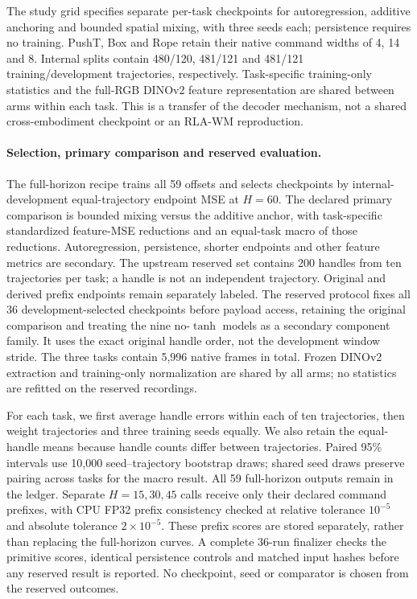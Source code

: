 The study grid specifies separate per-task checkpoints for autoregression,
additive anchoring and bounded spatial mixing, with three seeds each;
persistence requires no training. PushT, Box and Rope retain their native
command widths of 4, 14 and 8. Internal splits contain 480/120, 481/121 and
481/121 training/development trajectories, respectively. Task-specific
training-only statistics and the full-RGB DINOv2 feature representation are
shared between arms within each task. This is a transfer of the decoder
mechanism, not a shared cross-embodiment checkpoint or an RLA-WM reproduction.

\paragraph{Selection, primary comparison and reserved evaluation.}
The full-horizon recipe trains all 59 offsets and selects checkpoints
by internal-development equal-trajectory endpoint MSE at $H=60$.
The declared primary comparison is bounded mixing versus the additive anchor,
with task-specific standardized feature-MSE reductions and an equal-task
macro of those reductions. Autoregression, persistence, shorter endpoints
and other feature metrics are secondary. The upstream reserved set contains
200 handles from ten trajectories per task; a handle is not an independent
trajectory. Original and derived prefix endpoints remain separately labeled.
The reserved protocol fixes all 36 development-selected checkpoints before
payload access, retaining the original comparison and treating the nine
no-$\tanh$ models as a secondary component family. It uses the exact original
handle order, not the development window stride. The three tasks contain
5,996 native frames in total. Frozen DINOv2 extraction and training-only
normalization are shared by all arms; no statistics are refitted on the
reserved recordings.

For each task, we first average handle errors within each of ten trajectories,
then weight trajectories and three training seeds equally. We also retain
the equal-handle means because handle counts differ between trajectories.
Paired 95\% intervals use 10,000 seed--trajectory bootstrap draws; shared
seed draws preserve pairing across tasks for the macro result.
All 59 full-horizon outputs remain in the ledger. Separate $H=15,30,45$
calls receive only their declared command prefixes, with CPU FP32 prefix
consistency checked at relative tolerance $10^{-5}$ and absolute tolerance
$2\times10^{-5}$. These prefix scores are stored separately, rather than
replacing the full-horizon curves. A complete 36-run finalizer checks the
primitive scores, identical persistence controls and matched input hashes
before any reserved result is reported. No checkpoint, seed or comparator is
chosen from the reserved outcomes.

